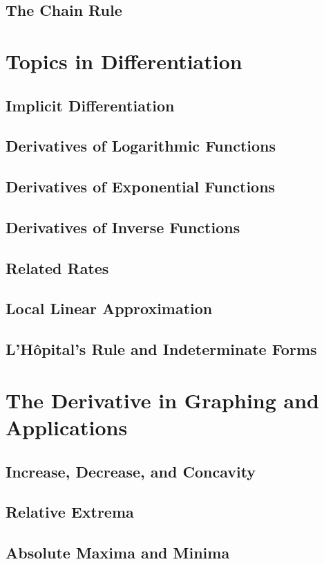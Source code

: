 \documentclass[letterpaper]{report}
\begin{document}
\section{The Chain Rule}

\chapter{Topics in Differentiation}
\section{Implicit Differentiation}
\section{Derivatives of Logarithmic Functions}
\section{Derivatives of Exponential Functions}
\section{Derivatives of Inverse Functions}
\section{Related Rates}
\section{Local Linear Approximation}
\section{L'H\^{o}pital's Rule and Indeterminate Forms}

\chapter{The Derivative in Graphing and Applications}
\section{Increase, Decrease, and Concavity}
\section{Relative Extrema}
\section{Absolute Maxima and Minima}
\end{document}
